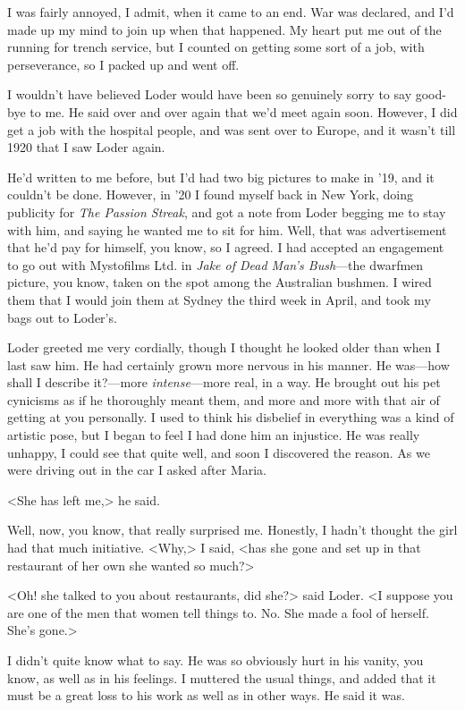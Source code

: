 I was fairly annoyed, I admit, when it came to an end. War was declared, and I'd made up my mind to join up when that happened. My heart put me out of the running for trench service, but I counted on getting some sort of a job, with perseverance, so I packed up and went off.

I wouldn't have believed Loder would have been so genuinely sorry to say good-bye to me. He said over and over again that we'd meet again soon. However, I did get a job with the hospital people, and was sent over to Europe, and it wasn't till 1920 that I saw Loder again.

He'd written to me before, but I'd had two big pictures to make in '19, and it couldn't be done. However, in '20 I found myself back in New York, doing publicity for \textit{The Passion Streak}, and got a note from Loder begging me to stay with him, and saying he wanted me to sit for him. Well, that was advertisement that he'd pay for himself, you know, so I agreed. I had accepted an engagement to go out with Mystofilms Ltd. in \textit{Jake of Dead Man's Bush}—the dwarfmen picture, you know, taken on the spot among the Australian bushmen. I wired them that I would join them at Sydney the third week in April, and took my bags out to Loder's.

Loder greeted me very cordially, though I thought he looked older than when I last saw him. He had certainly grown more nervous in his manner. He was—how shall I describe it?—more \textit{intense}—more real, in a way. He brought out his pet cynicisms as if he thoroughly meant them, and more and more with that air of getting at you personally. I used to think his disbelief in everything was a kind of artistic pose, but I began to feel I had done him an injustice. He was really unhappy, I could see that quite well, and soon I discovered the reason. As we were driving out in the car I asked after Maria.

<She has left me,> he said.

Well, now, you know, that really surprised me. Honestly, I hadn't thought the girl had that much initiative. <Why,> I said, <has she gone and set up in that restaurant of her own she wanted so much?>

<Oh! she talked to you about restaurants, did she?> said Loder. <I suppose you are one of the men that women tell things to. No. She made a fool of herself. She's gone.>

I didn't quite know what to say. He was so obviously hurt in his vanity, you know, as well as in his feelings. I muttered the usual things, and added that it must be a great loss to his work as well as in other ways. He said it was.

